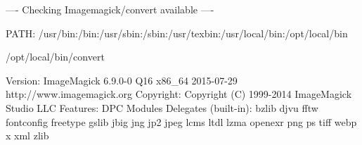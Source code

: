 ---- Checking Imagemagick/convert available ----

PATH: /usr/bin:/bin:/usr/sbin:/sbin:/usr/texbin:/usr/local/bin:/opt/local/bin

/opt/local/bin/convert

Version: ImageMagick 6.9.0-0 Q16 x86_64 2015-07-29 http://www.imagemagick.org
Copyright: Copyright (C) 1999-2014 ImageMagick Studio LLC
Features: DPC Modules
Delegates (built-in): bzlib djvu fftw fontconfig freetype gslib jbig jng jp2 jpeg lcms ltdl lzma openexr png ps tiff webp x xml zlib